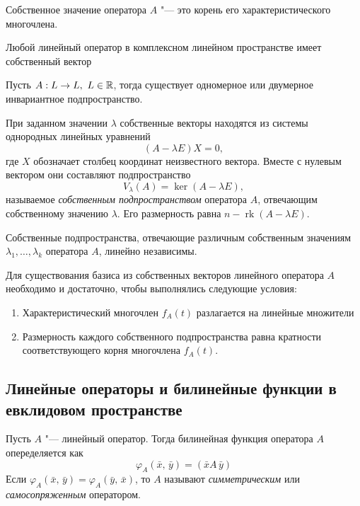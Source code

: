 \begin{theorem}
  Собственное значение оператора $A$ "--- это корень его характеристического многочлена.
\end{theorem}

\begin{theorem}
  Любой линейный оператор в комплексном линейном пространстве имеет собственный вектор
\end{theorem}

\begin{theorem}
  Пусть $A: L \to L,~ L \in \mathbb{R}$, тогда существует одномерное или двумерное инвариантное подпространство.
\end{theorem}

При заданном значении $\lambda$ собственные векторы находятся из системы однородных линейных уравнений
$$
  (A - \lambda E)X = 0,
$$
где $X$ обозначает столбец координат неизвестного вектора. Вместе с нулевым вектором они составляют подпространство
$$
  V_\lambda(A) = \ker(A - \lambda E),
$$
называемое \textit{собственным подпространством} оператора $A$, отвечающим собственному значению $\lambda$. Его размерность равна $n - \operatorname{rk}(A - \lambda E)$.

\begin{theorem}
  Собственные подпространства, отвечающие различным собственным значениям $\lambda_1, \ldots, \lambda_k$ оператора $A$, линейно независимы.
\end{theorem}

\begin{theorem}
  Для существования базиса из собственных векторов линейного оператора $A$ необходимо и достаточно, чтобы выполнялись следующие условия:
  \begin{enumerate}
    \item Характеристический многочлен $f_A(t)$ разлагается на линейные множители
    \item Размерность каждого собственного подпространства равна кратности соответствующего корня многочлена $f_A(t)$.
  \end{enumerate}
\end{theorem}

\subsection*{Линейные операторы и билинейные функции в евклидовом пространстве}
\begin{definition}
  Пусть $A$ "--- линейный оператор. Тогда билинейная функция оператора $A$ опеределяется как
  $$
    \varphi_A(\bar{x}, \, \bar{y}) = (\bar{x} A\, \bar{y}) 
  $$
  Если $\varphi_A(\bar{x}, \, \bar{y}) = \varphi_A(\bar{y},\, \bar{x})$, то $A$ называют \textit{симметрическим} или \textit{самосопряженным} оператором.
\end{definition}

